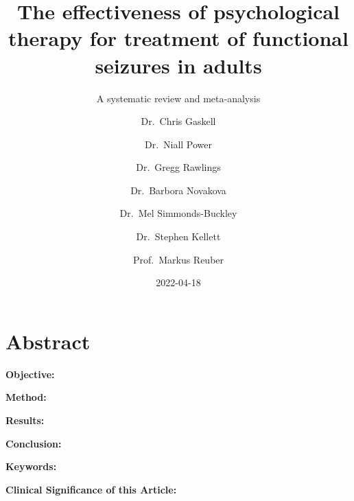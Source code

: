 \documentclass[
  12pt,
  openany]{book}
\title{The effectiveness of psychological therapy for treatment of functional seizures in adults}
\subtitle{A systematic review and meta-analysis}
\author{Dr.~Chris Gaskell \and Dr.~Niall Power \and Dr.~Gregg Rawlings \and Dr.~Barbora Novakova \and Dr.~Mel Simmonds-Buckley \and Dr.~Stephen Kellett \and Prof.~Markus Reuber}
\date{2022-04-18}
\begin{document}
\maketitle

{
\setcounter{tocdepth}{1}
\tableofcontents
}
\hypertarget{Abstract}{%
\chapter*{Abstract}\label{Abstract}}

\textbf{Objective:}

\textbf{Method:}

\textbf{Results:}

\textbf{Conclusion:}

\textbf{Keywords:}

\textbf{Clinical Significance of this Article:}
\end{document}
